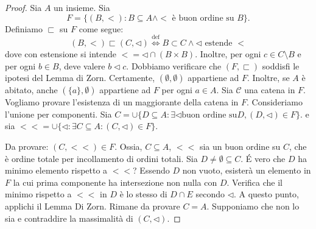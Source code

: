 \begin{proof}
  Sia \(A\) un insieme. Sia
  \begin{equation}
    F = \lbrace (B, <) \colon B \subseteq A \land <\, \, \text{è buon ordine su}\, \, B\rbrace.
  \end{equation}
  Definiamo \(\sqsubset\) su \(F\) come segue:
  \begin{equation}
    (B, <) \sqsubset (C, \lhd) \overset{\mathrm{def}}{\iff} B \subset C \land \lhd \, \, \text{estende} \, \, <
  \end{equation}
  dove con estensione si intende \(< = \lhd \cap (B \times B)\). Inoltre, per ogni \(c \in C \setminus B\) e per ogni \(b \in B\), deve valere \(b \lhd c\).
  Dobbiamo verificare che \((F,\sqsubset)\) soddisfi le ipotesi del Lemma di Zorn. Certamente, \((\emptyset,\emptyset)\) appartiene ad \(F\). Inoltre, se \(A\) è abitato, anche \((\lbrace a \rbrace, \emptyset)\) appartiene ad \(F\) per ogni \(a \in A\). Sia \(\mathcal{C}\) una catena in \(F\). Vogliamo provare l'esistenza di un maggiorante della catena in \(F\). Consideriamo l'unione per componenti. Sia \(C = \cup \lbrace D \subseteq A \colon \exists \lhd \text{buon ordine su} D, (D, \lhd) \in F\rbrace.\) e sia \(<< = \cup \lbrace \lhd \colon \exists C \subseteq A \colon (C, \lhd) \in F\rbrace\).

  Da provare: \((C, <<) \in F\). Ossia, \(C \subseteq A\), \(<<\) sia un buon ordine su \(C\), che è ordine totale per incollamento di ordini totali. Sia \(D \ne \emptyset \subseteq C\). \'E vero che \(D\) ha minimo elemento rispetto a \(<<\)? Essendo \(D\) non vuoto, esisterà un elemento in \(F\) la cui prima componente ha intersezione non nulla con \(D\). Verifica che il minimo rispetto a \(<<\) in \(D\) è lo stesso di \(D \cap E\) secondo \(\lhd\).
  A questo punto, applichi il Lemma Di Zorn. Rimane da provare \(C = A\). Supponiamo che non lo sia e contraddire la massimalità di \((C, \lhd)\).
\end{proof}
